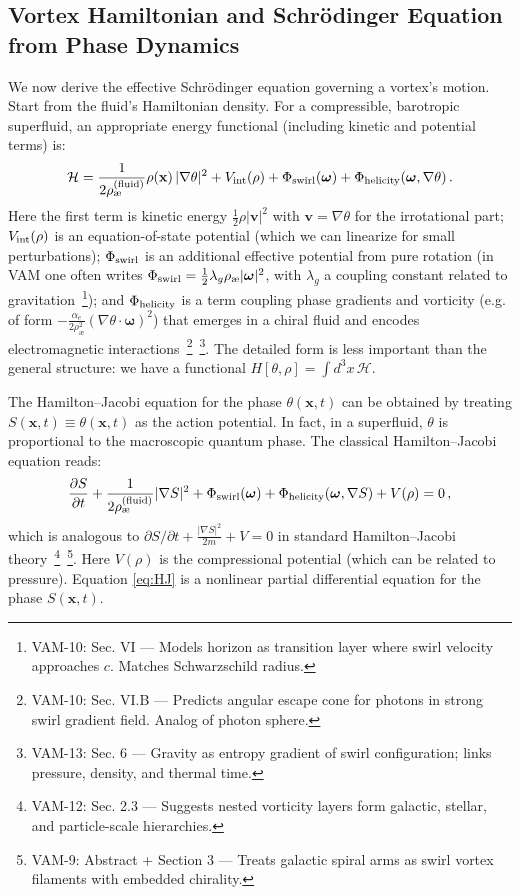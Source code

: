 \documentclass[a4paper,12pt]{article}
\begin{document}
    \subsection{Vortex Hamiltonian and Schrödinger Equation from Phase Dynamics}
    We now derive the effective Schrödinger equation governing a vortex’s motion. Start from the fluid’s Hamiltonian density. For a compressible, barotropic superfluid, an appropriate energy functional (including kinetic and potential terms) is:
    \begin{equation}
        \mathcal{H} = \frac{1}{2\rho_{\text{\ae}}^{(\text{fluid})}} \rho(\mathbf{x})\,|\nabla \theta|^2 + V_{\rm int}(\rho) + \Phi_{\rm swirl}(\boldsymbol{\omega}) + \Phi_{\rm helicity}(\boldsymbol{\omega}, \nabla \theta)\,.
        \label{eq:Hamiltonian-density}
    \end{equation}
    Here the first term is kinetic energy $\frac{1}{2} \rho |\mathbf{v}|^2$ with $\mathbf{v}=\nabla \theta$ for the irrotational part; $V_{\rm int}(\rho)$ is an equation-of-state potential (which we can linearize for small perturbations); $\Phi_{\rm swirl}$ is an additional effective potential from pure rotation (in VAM one often writes $\Phi_{\rm swirl} = \frac{1}{2}\lambda_g \rho_{\text{\ae}} |\boldsymbol{\omega}|^2$, with $\lambda_g$ a coupling constant related to gravitation~\footnote{VAM-10: Sec. VI — Models horizon as transition layer where swirl velocity approaches $c$. Matches Schwarzschild radius.}); and $\Phi_{\rm helicity}$ is a term coupling phase gradients and vorticity (e.g. of form $-\frac{\alpha_e}{2\rho_{\text{\ae}}^2}(\nabla \theta \cdot \boldsymbol{\omega})^2$) that emerges in a chiral fluid and encodes electromagnetic interactions~\footnote{VAM-10: Sec. VI.B — Predicts angular escape cone for photons in strong swirl gradient field. Analog of photon sphere.}~\footnote{VAM-13: Sec. 6 — Gravity as entropy gradient of swirl configuration; links pressure, density, and thermal time.}. The detailed form is less important than the general structure: we have a functional $H[\theta, \rho] = \int d^3x\, \mathcal{H}$.

    The Hamilton–Jacobi equation for the phase $\theta(\mathbf{x},t)$ can be obtained by treating $S(\mathbf{x},t) \equiv \theta(\mathbf{x},t)$ as the action potential. In fact, in a superfluid, $\theta$ is proportional to the macroscopic quantum phase. The classical Hamilton–Jacobi equation reads:
    \begin{equation}
        \frac{\partial S}{\partial t} + \frac{1}{2\rho_{\text{\ae}}^{(\text{fluid})}} |\nabla S|^2 + \Phi_{\rm swirl}(\boldsymbol{\omega}) + \Phi_{\rm helicity}(\boldsymbol{\omega},\nabla S) + V(\rho) = 0\,,
        \label{eq:HJ}
    \end{equation}
    which is analogous to $\partial S/\partial t + \frac{|\nabla S|^2}{2m}+V=0$ in standard Hamilton–Jacobi theory~\footnote{VAM-12: Sec. 2.3 — Suggests nested vorticity layers form galactic, stellar, and particle-scale hierarchies.}~\footnote{VAM-9: Abstract + Section 3 — Treats galactic spiral arms as swirl vortex filaments with embedded chirality.}. Here $V(\rho)$ is the compressional potential (which can be related to pressure). Equation \eqref{eq:HJ} is a nonlinear partial differential equation for the phase $S(\mathbf{x},t)$.
\end{document}
